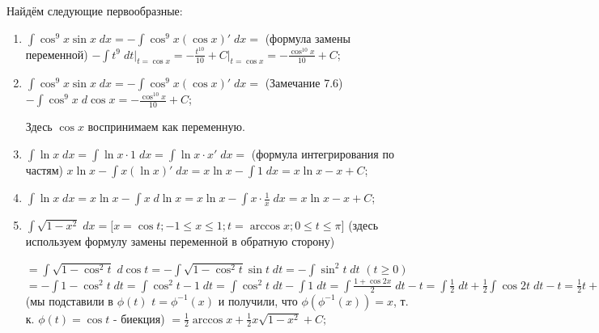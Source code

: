     \begin{example} Найдём следующие первообразные:
    
    \begin{enumerate}
    	\item[1.1] $\displaystyle\int \cos^9{x} \sin{x} \; dx = -\displaystyle\int \cos^9{x} (\cos{x})' \; dx =$ (формула замены переменной) $-\displaystyle\int t^9 \; dt\bigg|_{t=\cos{x}} = -\frac{t^{10}}{10} + C\bigg|_{t=\cos{x}} = -\frac{\cos^{10}{x}}{10} + C$;
    		
    	\item[1.2] $\displaystyle\int \cos^9{x} \sin{x} \; dx = -\displaystyle\int \cos^9{x} (\cos{x})' \; dx =$ (Замечание 7.6) $ -\displaystyle\int \cos^9{x} \;  d\cos{x} = -\frac{\cos^{10}{x}}{10} + C$;
    		
    	Здесь $\cos{x}$ воспринимаем как переменную.
    	
    	\item[2.1] $\displaystyle\int \ln{x} \; dx = \displaystyle\int \ln{x} \cdot 1 \; dx = \displaystyle\int \ln{x} \cdot x' \; dx =$ (формула интегрирования по частям) $x\ln{x} - \displaystyle\int x(\ln{x})' \; dx = x\ln{x} - \displaystyle\int 1 \; dx = x\ln{x} - x + C$;
    		
    	\item[2.2] $\displaystyle\int \ln{x} \; dx = x\ln{x} - \displaystyle\int x \; d\ln{x} = x\ln{x} - \displaystyle\int x \cdot \frac{1}{x} \; dx = x\ln{x} - x + C$;
    	
    	\item[3.] $\displaystyle\int \sqrt{1 - x^2} \; dx = \bigg[x = \cos{t}; -1 \leqslant x \leqslant 1; t = \arccos{x}; 0 \leqslant t \leqslant \pi \bigg]$ (здесь используем формулу замены переменной в обратную сторону) 
    	
    	$= \displaystyle\int \sqrt{1 - \cos^2{t}} \; d\cos{t} = -\displaystyle\int \sqrt{1 - \cos^2{t}} \sin{t} \; dt = -\displaystyle\int \sin^2{t} \; dt$ $(t \geqslant 0)$ $= -\displaystyle\int 1 - \cos^2{t} \; dt = \displaystyle\int \cos^2{t} - 1 \; dt = \displaystyle\int \cos^2{t} \; dt - \displaystyle\int 1 \; dt = \displaystyle\int \frac{1 + \cos{2x}}{2} \; dt - t = \displaystyle\int \frac{1}{2} \; dt + \frac{1}{2} \displaystyle\int \cos{2t} \; dt - t = \frac{1}{2}t + \frac{1}{2}\frac{\sin{2t}}{2} + C = \frac{1}{2}t + \frac{1}{2}\sin{t}\cos{t} + C = \frac{1}{2}\arccos{x} + \frac{1}{2}\cos{(\arccos{x})}\sin{(\arccos{x})} + C$ (мы подставили в $\phi(t)$ $t = \phi^{-1}(x)$ и получили, что $\phi(\phi^{-1}(x)) = x$, т. к. $\phi(t) = \cos{t}$ - биекция) $= \frac{1}{2}\arccos{x} + \frac{1}{2}x\sqrt{1 - x^2} + C;$
    	
    \end{enumerate}
    \end{example}
      

